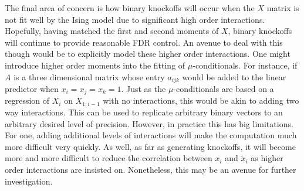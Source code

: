 \documentclass[11pt]{article}
\theoremstyle{definition}
\begin{document}
    The final area of concern is how binary knockoffs will occur when the $X$ matrix is not fit well by the Ising model due to significant high order interactions. Hopefully, having matched the first and second moments of $X$, binary knockoffs will continue to provide reasonable FDR control. An avenue to deal with this though would be to explicitly model these higher order interactions. One might introduce higher order moments into the fitting of $\mu$-conditionals. For instance, if $A$ is a three dimensional matrix whose entry $a_{ijk}$ would be added to the linear predictor when $x_i=x_j=x_k=1$. Just as the $\mu$-conditionals are based on a regression of $X_i$ on $X_{1:i-1}$ with no interactions, this would be akin to adding two way interactions. This can be used to replicate arbitrary binary vectors to an arbitrary desired level of precision. However, in practice this has big limitations. For one, adding additional levels of interactions will make the computation much more difficult very quickly. As well, as far as generating knockoffs, it will become more and more difficult to reduce the correlation between $x_i$ and $\tilde x_i$ as higher order interactions are insisted on. Nonetheless, this may be an avenue for further investigation. \par
   


    

\nocite{*}
\printbibliography[heading=bibintoc]
\end{document}
